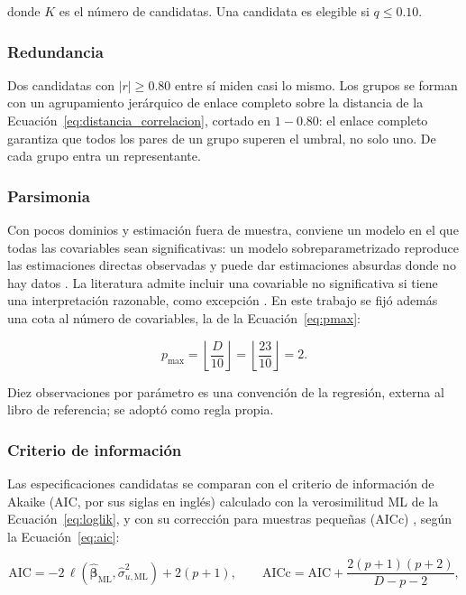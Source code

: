 donde $K$ es el número de candidatas. Una candidata es elegible si $q \leq 0.10$.

\subsubsection{Redundancia}

Dos candidatas con $|r| \geq 0.80$ entre sí miden casi lo mismo. Los grupos se forman con un agrupamiento jerárquico de enlace completo sobre la distancia de la Ecuación~\ref{eq:distancia_correlacion}, cortado en $1 - 0.80$: el enlace completo garantiza que todos los pares de un grupo superen el umbral, no solo uno. De cada grupo entra un representante.

\subsubsection{Parsimonia}

Con pocos dominios y estimación fuera de muestra, conviene un modelo en el que todas las covariables sean significativas: un modelo sobreparametrizado reproduce las estimaciones directas observadas y puede dar estimaciones absurdas donde no hay datos \cite[p.~453]{morales2021smallarea}. La literatura admite incluir una covariable no significativa si tiene una interpretación razonable, como excepción \cite[pp.~453--454]{morales2021smallarea}. En este trabajo se fijó además una cota al número de covariables, la de la Ecuación~\ref{eq:pmax}:

\begin{equation}
    p_{\max} = \left\lfloor \frac{D}{10} \right\rfloor = \left\lfloor \frac{23}{10} \right\rfloor = 2 .
    \label{eq:pmax}
\end{equation}

Diez observaciones por parámetro es una convención de la regresión, externa al libro de referencia; se adoptó como regla propia.

\subsubsection{Criterio de información}

Las especificaciones candidatas se comparan con el criterio de información de Akaike (AIC, por sus siglas en inglés) calculado con la verosimilitud ML de la Ecuación~\ref{eq:loglik}, y con su corrección para muestras pequeñas (AICc) \cite{HurvichTsai1989}, según la Ecuación~\ref{eq:aic}:

\begin{equation}
    \text{AIC} = -2\,\ell(\hat{\boldsymbol{\beta}}_{\text{ML}}, \hat{\sigma}^2_{u,\text{ML}}) + 2(p+1), \qquad \text{AICc} = \text{AIC} + \frac{2(p+1)(p+2)}{D-p-2},
    \label{eq:aic}
\end{equation}

